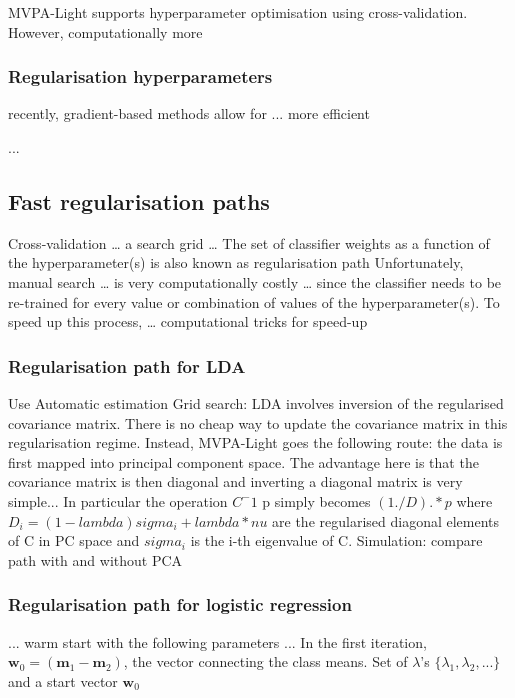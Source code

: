 \documentclass[utf8]{frontiersSCNS} %
\newcommand{\m}{\mathbf{m}}
\newcommand{\w}{\mathbf{w}}
\begin{document}
MVPA-Light supports hyperparameter optimisation using cross-validation. However, computationally more

\subsubsection{Regularisation hyperparameters}

recently, gradient-based methods allow for ... more efficient

...



\subsection{Fast regularisation paths}


Cross-validation … a search grid … The set of classifier weights as a function of the hyperparameter(s) is also known as regularisation path
Unfortunately, manual search … is very computationally costly … since the classifier needs to be re-trained for every value or combination of values of the hyperparameter(s). To speed up this process, … computational tricks for speed-up

\subsubsection{Regularisation path for LDA}
Use Automatic estimation
Grid search: LDA involves inversion of the regularised covariance matrix. There is no cheap way to update the covariance matrix in this regularisation regime. Instead, MVPA-Light goes the following route: the data is first mapped into principal component space. The advantage here is that the covariance matrix is then diagonal and inverting a diagonal matrix is very simple... In particular the operation $C^-1$ p simply becomes $(1./D) .* p$ where $D_i = (1-lambda) sigma_i + lambda * nu$ are the regularised diagonal elements of C in PC space and $sigma_i$ is the i-th eigenvalue of C.
Simulation: compare path with and without PCA

\subsubsection{Regularisation path for logistic regression}

... warm start with the following parameters ... In the first iteration, $\w_0 = (\m_1 - \m_2)$, the vector connecting the class means. Set of $\lambda$'s $\{\lambda_1, \lambda_2, ...\}$ and a start vector $\w_0$
\end{document}
